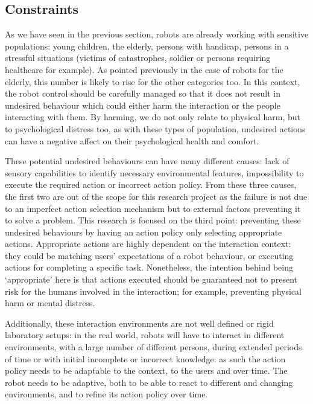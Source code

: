 \subsection{Constraints}

    As we have seen in the previous section, robots are already working with
    sensitive populations: young children, the elderly, persons with handicap,
    persons in a stressful situations (victims of catastrophes, soldier or
    persons requiring healthcare for example). As pointed previously in the case
    of robots for the elderly, this number is likely to rise for the other
    categories too. In this context, the robot control should be carefully
    managed so that it does not result in undesired behaviour which could either
    harm the interaction or the people interacting with them. By harming, we do
    not only relate to physical harm, but to psychological distress too, as with
    these types of population, undesired actions can have a negative affect on
    their psychological health and comfort.

    These potential undesired behaviours can have many different causes: lack of
    sensory capabilities to identify necessary environmental features,
    impossibility to execute the required action or incorrect action policy.
    From these three causes, the first two are out of the scope for this
    research project as the failure is not due to an imperfect action selection
    mechanism but to external factors preventing it to solve a problem. This
    research is focused on the third point: preventing these undesired
    behaviours by having an action policy only selecting appropriate actions.
    Appropriate actions are highly dependent on the interaction context: they
    could be matching users' expectations of a robot behaviour, or executing
    actions for completing a specific task. Nonetheless, the intention behind
    being `appropriate' here is that actions executed should be guaranteed not
    to present risk for the humans involved in the interaction; for example,
    preventing physical harm or mental distress.

    Additionally, these interaction environments are not well defined or rigid
    laboratory setups: in the real world, robots will have to interact in
    different environments, with a large number of different persons, during
    extended periods of time or with initial incomplete or incorrect knowledge:
    as such the action policy needs to be adaptable to the context, to the users
    and over time. The robot needs to be adaptive, both to be able to react to
    different and changing environments, and to refine its action policy over
    time.


